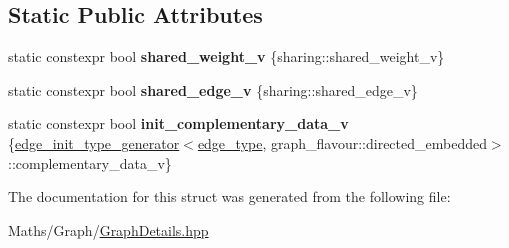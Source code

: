 \subsection*{Static Public Attributes}
\begin{DoxyCompactItemize}
\item 
\mbox{\label{structsequoia_1_1maths_1_1graph__impl_1_1edge__type__generator_3_01graph__flavour_1_1directed__e5563bfe8942c6d0abe1edf2ec49203fb_ac59e5c45e7f64e1f7edd0c0d99015c89}} 
static constexpr bool {\bfseries shared\+\_\+weight\+\_\+v} \{sharing\+::shared\+\_\+weight\+\_\+v\}
\item 
\mbox{\label{structsequoia_1_1maths_1_1graph__impl_1_1edge__type__generator_3_01graph__flavour_1_1directed__e5563bfe8942c6d0abe1edf2ec49203fb_a4a015168b078aa0bc748724626337477}} 
static constexpr bool {\bfseries shared\+\_\+edge\+\_\+v} \{sharing\+::shared\+\_\+edge\+\_\+v\}
\item 
\mbox{\label{structsequoia_1_1maths_1_1graph__impl_1_1edge__type__generator_3_01graph__flavour_1_1directed__e5563bfe8942c6d0abe1edf2ec49203fb_a0a87ecde55b0f02028d9372a061c4cd3}} 
static constexpr bool {\bfseries init\+\_\+complementary\+\_\+data\+\_\+v} \{\mbox{\hyperlink{structsequoia_1_1maths_1_1graph__impl_1_1edge__init__type__generator}{edge\+\_\+init\+\_\+type\+\_\+generator}}$<$\mbox{\hyperlink{classsequoia_1_1maths_1_1embedded__edge}{edge\+\_\+type}}, graph\+\_\+flavour\+::directed\+\_\+embedded$>$\+::complementary\+\_\+data\+\_\+v\}
\end{DoxyCompactItemize}


The documentation for this struct was generated from the following file\+:\begin{DoxyCompactItemize}
\item 
Maths/\+Graph/\mbox{\hyperlink{_graph_details_8hpp}{Graph\+Details.\+hpp}}\end{DoxyCompactItemize}
